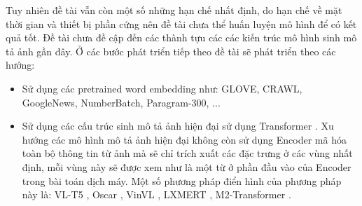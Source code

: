 \documentclass[14pt, a4paper]{article}
\numberwithin{equation}{section}
\numberwithin{algorithm}{section}
\numberwithin{figure}{section}
\numberwithin{table}{section}
\numberwithin{dl}{section}
\numberwithin{md}{section}
\numberwithin{bd}{section}
\numberwithin{dn}{section}
\numberwithin{hq}{section}
\begin{document}
    Tuy nhiên đề tài vẫn còn một số những hạn chế nhất định, do hạn chế về mặt thời gian và thiết bị phần cứng nên đề tài chưa thể huấn luyện mô hình để có kết quả tốt.
    Đề tài chưa đề cập đến các thành tựu các các kiến trúc mô hình sinh mô tả ảnh gần đây. Ở các bước phát triển tiếp theo đề tài sẽ phát triển theo các hướng:

    \begin{itemize}
        \item Sử dụng các pretrained word embedding như: GLOVE, CRAWL, GoogleNews, NumberBatch, Paragram-300, ... 
        \item Sử dụng các cấu trúc sinh mô tả ảnh hiện đại sử dụng Transformer \cite{vaswani2017attention}. 
        Xu hướng các mô hình mô tả ảnh hiện đại không còn sử dụng Encoder mã hóa toàn bộ thông tin từ ảnh mà sẽ chỉ trích xuất các đặc trưng ở các vùng nhất định, mỗi vùng này sẽ được xem như là một từ ở phần đầu vào của Encoder trong bài toán dịch máy.
        Một số phương pháp điển hình của phương pháp này là: VL-T5 \cite{cho2021unifying}, Oscar \cite{li2020oscar}, VinVL \cite{zhang2021vinvl}, LXMERT \cite{tan2019lxmert}, M2-Transformer \cite{cornia2020meshed}.
    \end{itemize}

    \newpage
    \printbibliography[title={TÀI LIỆU THAM KHẢO}]

\end{document}
